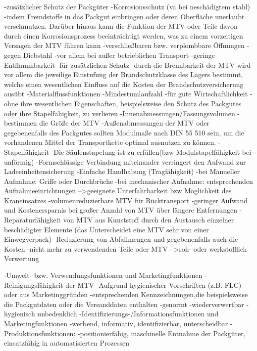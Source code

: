             -zusätzlicher Schutz der Packgüter
        -Korrosionsschutz (va bei neschädigtem stahl)
            -indem Fremdstoffe in das Packgut einbringen oder deren Oberfläche unerlaubt verschmutzen. Darüber hinaus kann die Funktion der MTV oder Teile davon durch einen Korrosionsprozess beeinträchtigt werden, was zu einem vorzeitigen Versagen der MTV führen kann
        -verschließbaren bzw. verplombbare Öffnungen
            -gegen Diebstahl
            -vor allem bei außer betrieblichen Transport
        -geringe Entflammbarkeit
            -für zusätzlichen Schutz
            -durch die Brennbarkeit der MTV wird vor allem die jeweilige Einstufung der Brandschutzklasse des Lagers bestimmt, welche einen wesentlichen Einfluss auf die Kosten der Brandschutzversicherung ausübt
    -Materialflussfunktionen
        -Mindestumlaufzahl
            -für gute Wirtschaftlichkeit
            -ohne ihre wesentlichen Eigenschaften, beispielsweise den Schutz des Packgutes oder ihre Stapelfähigkeit, zu verlieren
        -Innenabmessungen/Fassungsvolumen
            -bestimmen die Größe der MTV
            -Außenabmessungen der MTV oder gegebenenfalls des Packgutes sollten Modulmaße nach DIN 55 510 sein, um die vorhandenen Mittel der Transportkette optimal ausnutzen zu können.
        -Stapelfähigkeit
            -Die Säulenstapelung ist zu erfüllen(bzw Modulstapelfähigkeit bei unförmig)
            -Formschlüssige Verbindung miteinander verringert den Aufwand zur Ladeeinheitensicherung
        -Einfache Handhabung (Tragfähigkeit)
            -bei Manueller Aufnahme: Griffe oder Durchbrüche
            -bei mechanischer Aufnahme: entsprechenden Aufnahmeeinrichtungen
                -->geeignete Unterfahrbarkeit bzw Möglichkeit des Kraneinsatzes
        -volumenreduzierbare MTV für Rücktransport
            -geringer Aufwand und Kostenersparnis bei großer Anzahl von MTV über längere Entfernungen
        -Reparaturfähigkeit von MTV aus Kunststoff durch den Austausch einzelner beschädigter Elemente (das Unterscheidet eine MTV sehr von einer Einwegverpack)
            -Reduzierung von Abfallmengen und gegebenenfalls auch die Kosten
            -nicht mehr zu verwendenden Teile oder MTV 
                -->roh- oder werkstofflich Verwertung
                
    -Umwelt- bzw. Verwendungsfunktionen und Marketingfunktionen
        -Reinigungsfähigkeit der MTV
            -Aufgrund hygienischer Vorschriften (z.B. FLC) oder aus Marketinggründen
        -entsprechenden Kennzeichnungen,die beispielsweise die Packgutdaten oder die Versanddaten enthalten    
        -genormt
        -wiederverwertbar
        -hygienisch unbedenklich
    -Identifizierungs-/Informationsfunktionen und Marketingfunktionen
        -werbend, informativ, identifizierbar, unterscheidbar
    -Produktionsfunktionen:
        -positionierfähig, maschinelle Entnahme der Packgüter, einsatzfähig in automatisierten Prozessen
        
